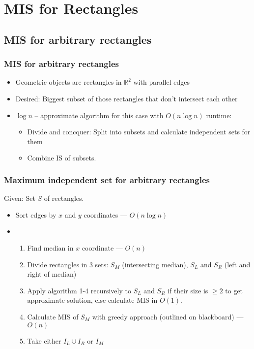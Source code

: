 \documentclass{beamer}
\begin{document}
\section{MIS for Rectangles}
\subsection{MIS for arbitrary rectangles}
\begin{frame}
\frametitle{MIS for arbitrary rectangles \cite{agarwallabel}}
\begin{itemize}
\item Geometric objects are rectangles in $\mathbb R^2$ with parallel edges
\item Desired: Biggest subset of those rectangles that don't intersect each other
\item $\log n$ -- approximate algorithm for this case with $O(n\log n)$ runtime: 
\begin{itemize}
\item Divide and concquer: Split into subsets and calculate independent sets for them
\item Combine IS of subsets.
\end{itemize}
\end{itemize}
\end{frame}

\begin{frame}
\frametitle{Maximum independent set for arbitrary rectangles}
Given: Set $S$ of rectangles.
\begin{itemize}
\item<1-> Sort edges by $x$ and $y$ coordinates --- $O(n\log n)$
\item<2-> \begin{enumerate}
\item<2-> Find median in $x$ coordinate --- $O(n)$
\item<3-> Divide rectangles in 3 sets: $S_M$ (intersecting median), $S_L$ and $S_R$ (left and right of median)
\item<4-> Apply algorithm 1-4 recursively to $S_L$ and $S_R$ if their size is $\geq 2$ to get approximate solution, else calculate MIS in $O(1)$.
\item<5-> Calculate MIS of $S_M$ with greedy approach (outlined on blackboard) --- $O(n)$
\item<6-> Take either $I_L \cup I_R$ or $I_M$ 
\end{enumerate}
\end{itemize}

\end{frame}
\end{document}
